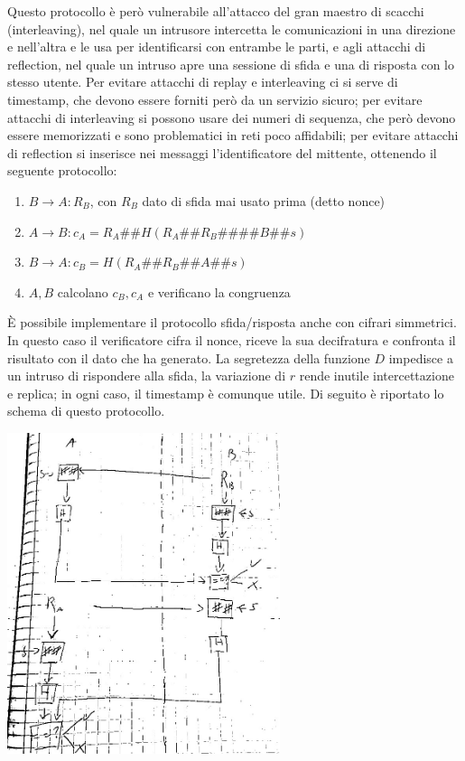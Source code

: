 \documentclass[answers, a4paper, 11pt]{exam}
\newcommand{\concat}{\#\#}
\begin{document}
\begin{questions}
\begin{parts}
\begin{solution}
	Questo protocollo è però vulnerabile all'attacco del gran maestro di scacchi (interleaving), nel quale un intrusore intercetta le comunicazioni in una direzione e nell'altra e le usa per identificarsi con entrambe le parti, e agli attacchi di reflection, nel quale un intruso apre una sessione di sfida e una di risposta con lo stesso utente.
	Per evitare attacchi di replay e interleaving ci si serve di timestamp, che devono essere forniti però da un servizio sicuro; per evitare attacchi di interleaving si possono usare dei numeri di sequenza, che però devono essere memorizzati e sono problematici in reti poco affidabili; per evitare attacchi di reflection si inserisce nei messaggi l'identificatore del mittente, ottenendo il seguente protocollo:
	  \begin{enumerate}
    \item $B \rightarrow A: R_B$, con $R_B$ dato di sfida mai usato prima (detto nonce)
    \item $A \rightarrow B: c_A = R_A \concat H(R_A \concat R_B \concat \concat B \concat s)$
		\item $B \rightarrow A: c_B = H(R_A \concat R_B \concat A \concat s)$
		\item $A, B$ calcolano $c_B, c_A$ e verificano la congruenza
  \end{enumerate}
	È possibile implementare il protocollo sfida/risposta anche con cifrari simmetrici.
	In questo caso il verificatore cifra il nonce, riceve la sua decifratura e confronta il risultato con il dato che ha generato.
	La segretezza della funzione $D$ impedisce a un intruso di rispondere alla sfida, la variazione di $r$ rende inutile intercettazione e replica; in ogni caso, il timestamp è comunque utile.
	Di seguito è riportato lo schema di questo protocollo.

\includegraphics[width=0.6\textwidth]{crhashmut}


\end{solution}
\end{parts}
\end{questions}
\end{document}
